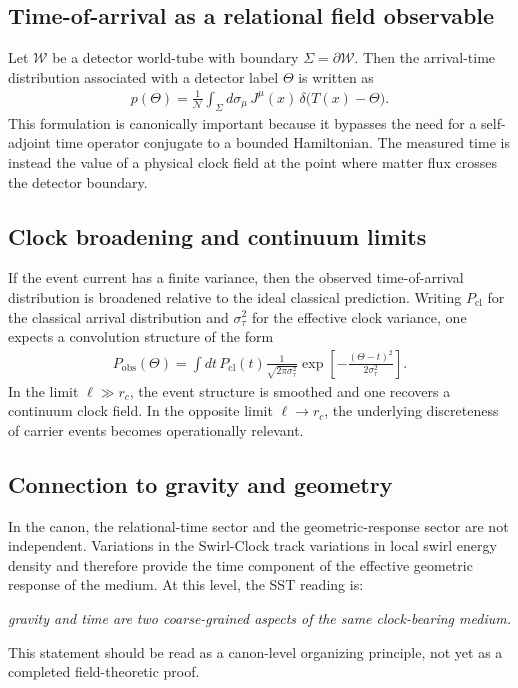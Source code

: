 \documentclass[11pt]{article}
\theoremstyle{definition}
\theoremstyle{plain}
\theoremstyle{remark}
\begin{document}
    \subsection{Time-of-arrival as a relational field observable}
        Let $\mathcal{W}$ be a detector world-tube with boundary $\Sigma = \partial \mathcal{W}$. Then the arrival-time distribution associated with a detector label $\Theta$ is written as
        \begin{align}
            p(\Theta) = \frac{1}{\mathcal{N}} \int_{\Sigma} d\sigma_\mu \, J^\mu(x)\,\delta\!\big(T(x)-\Theta\big).
        \end{align}
        This formulation is canonically important because it bypasses the need for a self-adjoint time operator conjugate to a bounded Hamiltonian. The measured time is instead the value of a physical clock field at the point where matter flux crosses the detector boundary.

    \subsection{Clock broadening and continuum limits}
        If the event current has a finite variance, then the observed time-of-arrival distribution is broadened relative to the ideal classical prediction. Writing $P_{\mathrm{cl}}$ for the classical arrival distribution and $\sigma_\tau^2$ for the effective clock variance, one expects a convolution structure of the form
        \begin{align}
            P_{\mathrm{obs}}(\Theta)
            =
            \int dt\,P_{\mathrm{cl}}(t)
            \frac{1}{\sqrt{2\pi\sigma_\tau^2}}
            \exp\!\left[-\frac{(\Theta-t)^2}{2\sigma_\tau^2}\right].
        \end{align}
        In the limit $\ell \gg r_c$, the event structure is smoothed and one recovers a continuum clock field. In the opposite limit $\ell \to r_c$, the underlying discreteness of carrier events becomes operationally relevant.

    \subsection{Connection to gravity and geometry}
        In the canon, the relational-time sector and the geometric-response sector are not independent. Variations in the Swirl-Clock track variations in local swirl energy density and therefore provide the time component of the effective geometric response of the medium. At this level, the SST reading is:
        \begin{center}
            \textit{gravity and time are two coarse-grained aspects of the same clock-bearing medium.}
        \end{center}
        This statement should be read as a canon-level organizing principle, not yet as a completed field-theoretic proof.
\end{document}

